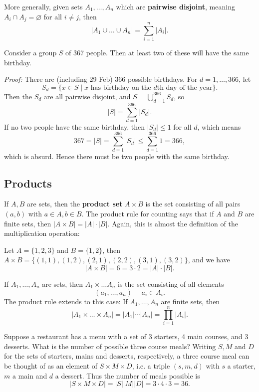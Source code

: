 \documentclass{amsart}
\begin{document}
	More generally, given sets $A_1,\dots, A_n$ which are \textbf{pairwise disjoint}, meaning $A_i \cap A_j = \varnothing$ for all $i \not= j$, then
	\[
	|A_1 \cup \dots \cup A_n| = \sum_{i=1}^n |A_i|.
	\]

	\begin{nex}
		Consider a group $S$ of 367 people.
		Then at least two of these will have the same birthday.
		
		\textit{Proof:} There are (including 29 Feb) 366 possible birthdays.
		For $d = 1, \dots, 366$, let
		\[
		S_d = \{x \in S \mid x\text{ has birthday on the }d\text{th day of the year}\}.
		\]
		Then the $S_d$ are all pairwise disjoint, and $S = \bigcup_{d=1}^{366} S_d$, so
		\[
		|S| = \sum_{d=1}^{366} |S_d|.
		\]
		If no two people have the same birthday, then $|S_d| \le 1$ for all $d$, which means
		\[
		367 = |S| = \sum_{d=1}^{366} |S_d| \le \sum_{d=1}^{366} 1 = 366,
		\]
		which is absurd.
		Hence there must be two people with the same birthday.
	\end{nex}
	
	\subsection{Products}
	If $A, B$ are sets, then the \textbf{product set} $A \times B$ is the set consisting of all pairs $(a,b)$ with $a \in A, b \in B$.
	The product rule for counting says that if $A$ and $B$ are finite sets, then $|A \times B| = |A| \cdot |B|$.
	Again, this is almost the definition of the multiplication operation:
	\begin{nex}
		Let $A = \{1, 2, 3\}$ and $B = \{1, 2\}$, then $A \times B = \{(1,1),(1,2),(2,1),(2,2),(3,1),(3,2)\}$, and we have
		\[
		|A \times B| = 6 = 3 \cdot 2 = |A| \cdot |B|.
		\]
	\end{nex}
If $A_1,\dots, A_n$ are sets, then $A_1 \times \dots A_n$ is the set consisting of all elements
\[
(a_1,\dots, a_n)\ \ \ \ \ \ a_i \in A_i.
\]
The product rule extends to this case: If $A_1,\dots, A_n$ are finite sets, then
\[
|A_1 \times \dots \times A_n| = |A_1|\cdots |A_n| = \prod_{i=1}^n |A_i|.
\]
\begin{nex}
	\label{ex:restaurant}
Suppose a restaurant has a menu with a set of 3 starters, 4 main courses, and 3 desserts.
What is the number of possible three course meals?
Writing $S, M$ and $D$ for the sets of starters, mains and desserts, respectively, a three course meal can be thought of as an element of $S \times M \times D$, i.e. a triple $(s,m,d)$ with $s$ a starter, $m$ a main and $d$ a dessert.
Thus the number of meals possible is 
\[
|S \times M \times D| = |S||M||D| = 3 \cdot 4 \cdot 3 = 36.
\]
\end{nex}
	
\end{document}
